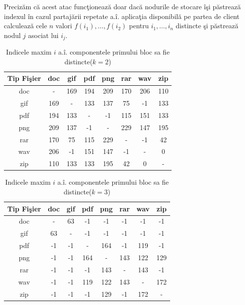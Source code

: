 \documentclass{llncs}
\begin{document}
Preciz\u{a}m c\u{a} acest atac func\c{t}ioneaz\u{a} doar dac\u{a} nodurile de stocare \^{i}\c{s}i p\u{a}streaz\u{a} indexul \^{i}n cazul partaj\u{a}rii repetate a.\^{i}. aplica\c{t}ia disponibil\u{a} pe partea de client calculeaz\u{a} cele $n$ valori $f(i_1),\dots,f(i_2)$ pentru $i_1,\dots,i_n$ distincte \c{s}i p\u{a}streaz\u{a} nodul $j$ asociat lui $i_j$.


\begin{table}[b]
\begin{center}
\caption{Indicele maxim $i$ a.\^{i}. componentele primului bloc sa fie distincte($k=2$)}\label{tb:margins}
\label{table:k2}
\begin{tabular}{cccccccc}
Tip Fi\c{s}ier & doc & gif & pdf & png & rar & wav & zip \\\hline
  doc & - & 169 & 194 & 209 & 170 & 206 & 110\\
  gif & 169 & - & 133 & 137 & 75 & -1 & 133\\
  pdf & 194 & 133 & - & -1 & 115 & 151 & 133\\
  png & 209 & 137 & -1 & - & 229 & 147 & 195\\
  rar & 170 & 75 & 115 & 229 & - & -1 & 42\\
  wav & 206 & -1 & 151 & 147 & -1 & - & 0\\
  zip & 110 & 133 & 133 & 195 & 42 & 0 & -\\ \hline
\end{tabular}
\end{center}
\end{table}


\begin{table}[H]
\begin{center}
\caption{Indicele maxim $i$ a.\^{i}. componentele primului bloc sa fie distincte($k=3$)}\label{tb:margins}
\label{table:k3}
\begin{tabular}{cccccccc}
Tip Fi\c{s}ier & doc & gif & pdf & png & rar & wav & zip \\\hline
  doc & - & 63 & -1 & -1 & -1 & -1 & -1\\
  gif & 63 & - & -1 & -1 & -1 & -1 & -1\\
  pdf & -1 & -1 & - & 164 & -1 & 119 & -1\\
  png & -1 & -1 & 164 & - & 143 & 122 & 129\\
  rar & -1 & -1 & -1 & 143 & - & 143 & -1\\
  wav & -1 & -1 & 119 & 122 & 143 & - & 172\\
  zip & -1 & -1 & -1 & 129 & -1 & 172 & -\\ \hline
\end{tabular}
\end{center}
\bigskip
\end{table}
\end{document}
